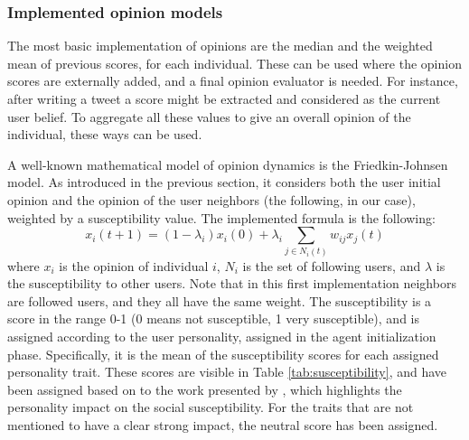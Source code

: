 \subsubsection{Implemented opinion models}
The most basic implementation of opinions are the median and the weighted mean of previous scores, for each individual. These can be used where the opinion scores are externally added, and a final opinion evaluator is needed. For instance, after writing a tweet a score might be extracted and considered as the current user belief. To aggregate all these values to give an overall opinion of the individual, these ways can be used.

A well-known mathematical model of opinion dynamics is the Friedkin-Johnsen model. As introduced in the previous section, it considers both the user initial opinion and the opinion of the user neighbors (the following, in our case), weighted by a susceptibility value.
The implemented formula is the following:
\[
x_i(t + 1) = (1 - \lambda_i) x_i(0) + \lambda_i  \sum_{j \in N_i(t)} w_{ij} x_j (t)
\]
where $x_i$ is the opinion of individual $i$, $N_i$ is the set of following users, and $\lambda$ is the susceptibility to other users. 
Note that in this first implementation neighbors are followed users, and they all have the same weight.
The susceptibility is a score in the range 0-1 (0 means not susceptible, 1 very susceptible), and is assigned according to the user personality, assigned in the agent initialization phase. Specifically, it is the mean of the susceptibility scores for each assigned personality trait. These scores are visible in Table \ref{tab:susceptibility}, and have been assigned based on to the work presented by \citet{oyibo2019personality}, which highlights the personality impact on the social susceptibility. For the traits that are not mentioned to have a clear strong impact, the neutral score has been assigned.

